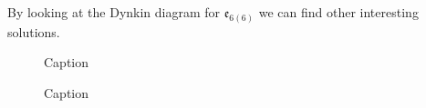 By looking at the Dynkin diagram for $\mathfrak{e}_{6(6)}$ we can find other interesting solutions. 


\begin{figure}
    \centering
    \caption{Caption}
    \label{fig:my_label}
\end{figure}
\begin{figure}
    \centering
    \caption{Caption}
    \label{fig:my_label}
\end{figure}